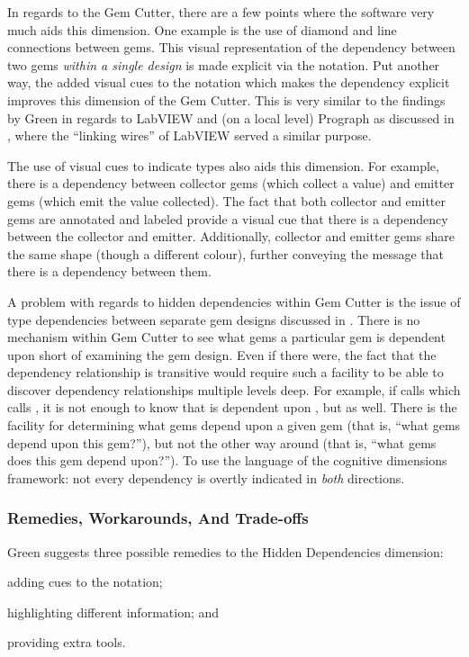 In regards to the Gem Cutter, there are a few points where the software very much aids this dimension.  One example is the use of diamond and line connections between gems.  This visual representation of the dependency between two gems \emph{within a single design} is made explicit via the notation.  Put another way, the added visual cues to the notation which makes the dependency explicit improves this dimension of the Gem Cutter.  This is very similar to the findings by Green in regards to LabVIEW and (on a local level) Prograph as discussed in , where the ``linking wires'' of LabVIEW served a similar purpose.

The use of visual cues to indicate types also aids this dimension.  For example, there is a dependency between collector gems (which collect a value) and emitter gems (which emit the value collected).  The fact that both collector and emitter gems are annotated and labeled provide a visual cue that there is a dependency between the collector and emitter.  Additionally, collector and emitter gems share the same shape (though a different colour), further conveying the message that there is a dependency between them.

A problem with regards to hidden dependencies within Gem Cutter is the issue of type dependencies between separate gem designs discussed in .  There is no mechanism within Gem Cutter to see what gems a particular gem is dependent upon short of examining the gem design.  Even if there were, the fact that the dependency relationship is transitive would require such a facility to be able to discover dependency relationships multiple levels deep.  For example, if  calls  which calls , it is not enough to know that  is dependent upon , but  as well.  There is the facility for determining what gems depend upon a given gem (that is, ``what gems depend upon this gem?''), but not the other way around (that is, ``what gems does this gem depend upon?'').  To use the language of the cognitive dimensions framework: not every dependency is overtly indicated in \emph{both} directions.

\subsubsection{Remedies, Workarounds, And Trade-offs}

Green suggests three possible remedies to the Hidden Dependencies dimension: 
\begin{inparaenum}[(a)]
	\item adding cues to the notation;
	\item highlighting different information; and 
	\item providing extra tools.
\end{inparaenum}

